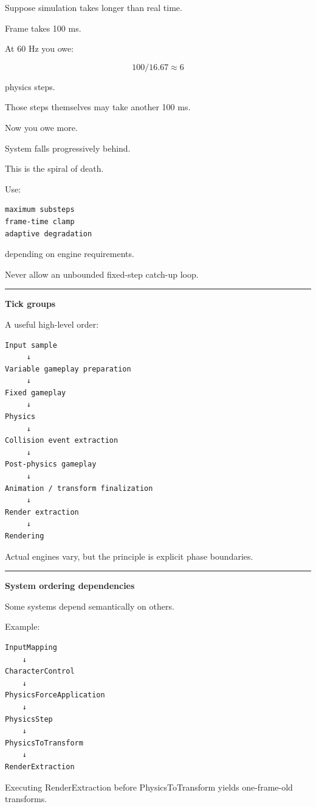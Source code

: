 Suppose simulation takes longer than real time.

Frame takes 100 ms.

At 60 Hz you owe:

\[
100/16.67\approx6
\]

physics steps.

Those steps themselves may take another 100 ms.

Now you owe more.

System falls progressively behind.

This is the spiral of death.

Use:

\begin{verbatim}
maximum substeps
frame-time clamp
adaptive degradation
\end{verbatim}

depending on engine requirements.

Never allow an unbounded fixed-step catch-up loop.

\begin{center}\rule{0.5\linewidth}{0.5pt}\end{center}

\textbf{Tick groups}

A useful high-level order:

\begin{verbatim}
Input sample
     ↓
Variable gameplay preparation
     ↓
Fixed gameplay
     ↓
Physics
     ↓
Collision event extraction
     ↓
Post-physics gameplay
     ↓
Animation / transform finalization
     ↓
Render extraction
     ↓
Rendering
\end{verbatim}

Actual engines vary, but the principle is explicit phase boundaries.

\begin{center}\rule{0.5\linewidth}{0.5pt}\end{center}

\textbf{System ordering dependencies}

Some systems depend semantically on others.

Example:

\begin{verbatim}
InputMapping
    ↓
CharacterControl
    ↓
PhysicsForceApplication
    ↓
PhysicsStep
    ↓
PhysicsToTransform
    ↓
RenderExtraction
\end{verbatim}

Executing RenderExtraction before PhysicsToTransform yields one-frame-old transforms.


